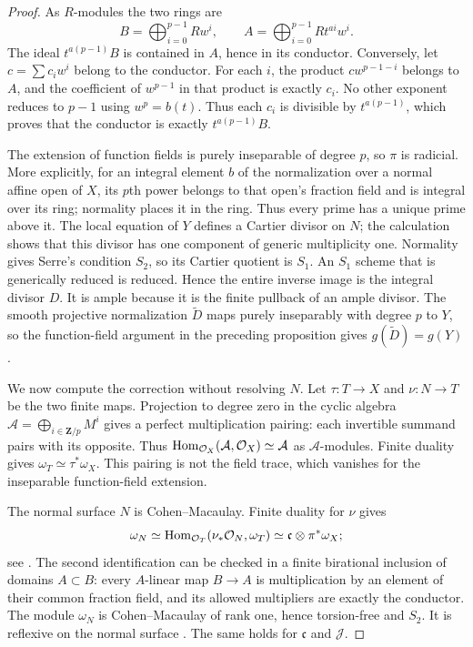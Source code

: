 \begin{proof}
As $R$-modules the two rings are
\[
 B=\bigoplus_{i=0}^{p-1}Rw^i,
 \qquad A=\bigoplus_{i=0}^{p-1}Rt^{ai}w^i.
\]
The ideal $t^{a(p-1)}B$ is contained in $A$, hence in its conductor.
Conversely, let $c=\sum c_iw^i$ belong to the conductor. For each $i$,
the product $cw^{p-1-i}$ belongs to $A$, and the coefficient of
$w^{p-1}$ in that product is exactly $c_i$. No other exponent reduces
to $p-1$ using $w^p=b(t)$. Thus each $c_i$ is divisible by
$t^{a(p-1)}$, which proves that the conductor is exactly
$t^{a(p-1)}B$.

The extension of function fields is purely inseparable of degree $p$,
so $\pi$ is radicial. More explicitly, for an integral element $b$ of
the normalization over a normal affine open of $X$, its $p$th power
belongs to that open's fraction field and is integral over its ring;
normality places it in the ring. Thus every prime has a unique prime
above it. The local equation of $Y$ defines a Cartier divisor on $N$;
the calculation shows that this divisor has one component of generic
multiplicity one. Normality gives Serre's condition $S_2$, so its
Cartier quotient is $S_1$. An $S_1$ scheme that is generically reduced
is reduced. Hence the entire inverse image is the integral divisor
$D$. It is ample because it is the finite pullback of an ample divisor.
The smooth projective normalization $\widetilde D$ maps purely
inseparably with degree $p$ to $Y$, so the function-field argument in
the preceding proposition gives $g(\widetilde D)=g(Y)$.

We now compute the correction without resolving $N$. Let $\tau:T\to X$
and $\nu:N\to T$ be the two finite maps. Projection to degree zero
in the cyclic algebra $\mathcal A=\bigoplus_{i\in\mathbf Z/p}M^i$
gives a perfect multiplication pairing: each invertible summand pairs
with its opposite. Thus
$\operatorname{Hom}_{\mathcal O_X}(\mathcal A,\mathcal O_X)\simeq\mathcal A$
as $\mathcal A$-modules. Finite duality gives
$\omega_T\simeq\tau^*\omega_X$. This pairing is not the field trace,
which vanishes for the inseparable function-field extension.

The normal surface $N$ is Cohen--Macaulay. Finite duality for $\nu$
gives
\[
 \omega_N\simeq
 \operatorname{Hom}_{\mathcal O_T}(\nu_*\mathcal O_N,\omega_T)
 \simeq\mathfrak c\otimes\pi^*\omega_X;
\]
see \cite[Tags 0AX2 and 0FVZ]{Stacks}. The second identification
can be checked in a finite birational inclusion of domains $A\subset B$:
every $A$-linear map $B\to A$ is multiplication by an element of their
common fraction field, and its allowed multipliers are exactly the
conductor. The module $\omega_N$ is Cohen--Macaulay of rank one,
hence torsion-free and $S_2$. It is reflexive on the normal surface
\cite[Tag 0AY6]{Stacks}. The same holds for $\mathfrak c$ and
$\mathcal J$.


\end{proof}
